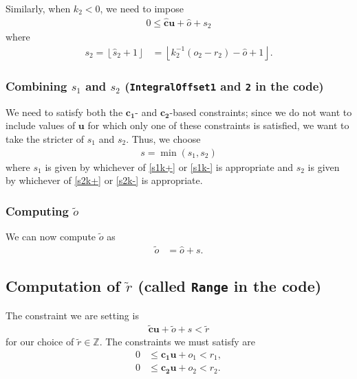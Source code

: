 \documentclass[11pt]{article}
\newcommand{\vect}[1]{\mathbf{#1}}
\newcommand{\floor}[1]{{\left\lfloor{#1}\right\rfloor}}
\begin{document}
Similarly, when $k_2 < 0$, we need to impose
\begin{align*}
0 \leq \widehat{\vect{c}}\vect{u} + \widehat{o} + s_2
\end{align*}
where
\begin{align}
s_2 = \floor{\widehat{s}_2 + 1} &= \floor{k_2^{-1}(o_2 - r_2) - \widehat{o} + 1}. \label{s2k-}
\end{align}

\subsubsection{Combining $s_1$ and $s_2$ (\texttt{IntegralOffset1} and \texttt{2} in the code)}

We need to satisfy both the $\vect{c_1}$- and $\vect{c_2}$-based constraints; since we do not want to include values of $\vect{u}$ for which only one of these constraints is satisfied, we want to take the stricter of $s_1$ and $s_2$. Thus, we choose
\begin{align}
s = \min(s_1, s_2)
\end{align}
where $s_1$ is given by whichever of \eqref{s1k+} or \eqref{s1k-} is appropriate and $s_2$ is given by whichever of \eqref{s2k+} or \eqref{s2k-} is appropriate.

\subsubsection{Computing $\widetilde{o}$}

We can now compute $\widetilde{o}$ as
\begin{align}
\widetilde{o} &= \widehat{o} + s.
\end{align}

\subsection{Computation of $\widetilde{r}$ (called \texttt{Range} in the code)}

The constraint we are setting is
\begin{align*}
\widetilde{\vect{c}}\vect{u} + \widetilde{o} + s < \widetilde{r}
\end{align*}
for our choice of $\widetilde{r} \in \mathbb{Z}$. The constraints we must satisfy are
\begin{align*}
0 &\leq \vect{c_1}\vect{u} + o_1 < r_1, \\
0 &\leq \vect{c_2}\vect{u} + o_2 < r_2.
\end{align*}
\end{document}
